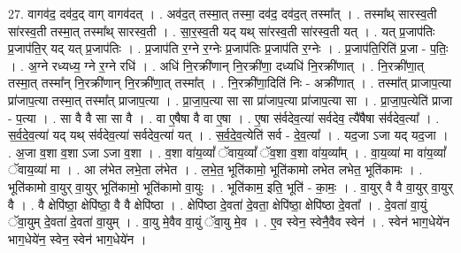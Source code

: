 \documentclass[17pt]{extarticle}
\begin{document}
27. वागव॑द॒ दव॑द॒द् वाग् वागव॑दत् । . अव॑द॒त् तस्मा॒त् तस्मा॒ दव॑द॒ दव॑द॒त् तस्मा᳚त् । . तस्मा᳚थ् सारस्व॒ती सा॑रस्व॒ती तस्मा॒त् तस्मा᳚थ् सारस्व॒ती । . सा॒र॒स्व॒ती यद् यथ् सा॑रस्व॒ती सा॑रस्व॒ती यत् । . यत् प्र॒जाप॑तिः प्र॒जाप॑ति॒र् यद् यत् प्र॒जाप॑तिः । . प्र॒जाप॑ति र॒ग्ने र॒ग्नेः प्र॒जाप॑तिः प्र॒जाप॑ति र॒ग्नेः । . प्र॒जाप॑ति॒रिति॑ प्र॒जा - प॒तिः॒ । . अ॒ग्ने रध्यध्य॒ ग्ने र॒ग्ने रधि॑ । . अधि॑ नि॒रक्री॑णान् नि॒रक्री॑णा॒ दध्यधि॑ नि॒रक्री॑णात् । . नि॒रक्री॑णा॒त् तस्मा॒त् तस्मा᳚न् नि॒रक्री॑णान् नि॒रक्री॑णा॒त् तस्मा᳚त् । . नि॒रक्री॑णा॒दिति॑ निः - अक्री॑णात् । . तस्मा᳚त् प्राजाप॒त्या प्रा॑जाप॒त्या तस्मा॒त् तस्मा᳚त् प्राजाप॒त्या । . प्रा॒जा॒प॒त्या सा सा प्रा॑जाप॒त्या प्रा॑जाप॒त्या सा । . प्रा॒जा॒प॒त्येति॑ प्राजा - प॒त्या । . सा वै वै सा सा वै । . वा ए॒षैषा वै वा ए॒षा । . ए॒षा स॑र्वदेव॒त्या॑ सर्वदेव॒ त्यै॑षैषा स॑र्वदेव॒त्या᳚ । . स॒र्व॒दे॒व॒त्या॑ यद् यथ् स॑र्वदेव॒त्या॑ सर्वदेव॒त्या॑ यत् । . स॒र्व॒दे॒व॒त्येति॑ सर्व - दे॒व॒त्या᳚ । . यद॒जा ऽजा यद् यद॒जा । . अ॒जा व॒शा व॒शा ऽजा ऽजा व॒शा । . व॒शा वा॑य॒व्यां᳚ ॅवाय॒व्यां᳚ ॅव॒शा व॒शा वा॑य॒व्या᳚म् । . वा॒य॒व्या॑ मा वा॑य॒व्यां᳚ ॅवाय॒व्या॑ मा । . आ ल॑भेत लभे॒ता ल॑भेत । . ल॒भे॒त॒ भूति॑कामो॒ भूति॑कामो लभेत लभेत॒ भूति॑कामः । . भूति॑कामो वा॒युर् वा॒युर् भूति॑कामो॒ भूति॑कामो वा॒युः । . भूति॑काम॒ इति॒ भूति॑ - का॒मः॒ । . वा॒युर् वै वै वा॒युर् वा॒युर् वै । . वै क्षेपि॑ष्ठा॒ क्षेपि॑ष्ठा॒ वै वै क्षेपि॑ष्ठा । . क्षेपि॑ष्ठा दे॒वता॑ दे॒वता॒ क्षेपि॑ष्ठा॒ क्षेपि॑ष्ठा दे॒वता᳚ । . दे॒वता॑ वा॒युं ॅवा॒युम् दे॒वता॑ दे॒वता॑ वा॒युम् । . वा॒यु मे॒वैव वा॒युं ॅवा॒यु मे॒व । . ए॒व स्वेन॒ स्वेनै॒वैव स्वेन॑ । . स्वेन॑ भाग॒धेये॑न भाग॒धेये॑न॒ स्वेन॒ स्वेन॑ भाग॒धेये॑न । \newline
\end{document}
